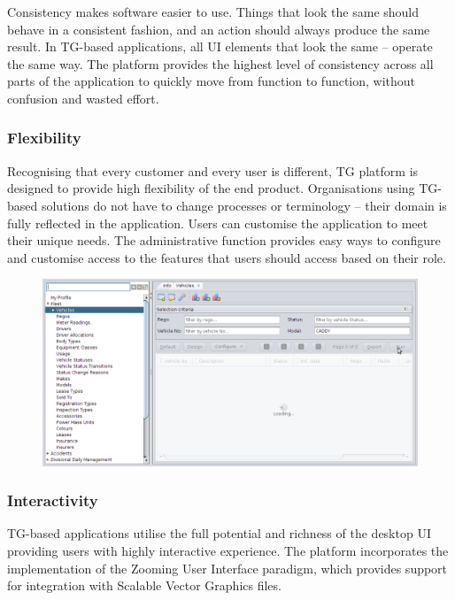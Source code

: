 \documentclass[a4paper,12pt,twocolumn,oneside,openright,final]{memoir}
\begin{document}
  Consistency makes software easier to use. 
  Things that look the same should behave in a consistent fashion, and an action should always produce the same result. 
  In TG-based applications, all UI elements that look the same -- operate the same way. 
  The platform provides the highest level of consistency across all parts of the application to quickly move from function to function, without confusion and wasted effort.
 
\subsubsection*{Flexibility}
  Recognising that every customer and every user is different, TG platform is designed to provide high flexibility of the end product. 
  Organisations using TG-based solutions do not have to change processes or terminology -- their domain is fully reflected in the application. 
  Users can customise the application to meet their unique needs.
  The administrative function provides easy ways to configure and customise access to the features that users should access based on their role.

  \begin{figure}[!h]
  \centering
  \includegraphics[scale=0.2]{images/03-running.png}
  \end{figure}

\subsubsection*{Interactivity}
  TG-based applications utilise the full potential and richness of the desktop UI providing users with highly interactive experience.
  The platform incorporates the implementation of the Zooming User Interface paradigm, which provides support for integration with Scalable Vector Graphics files.
\end{document}
